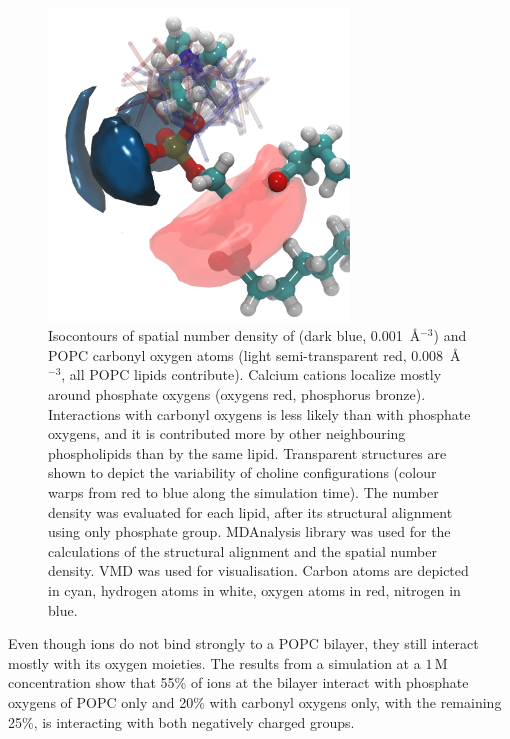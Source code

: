 \documentclass[journal=jpcbfk,manuscript=article]{achemso}
\begin{document}
\begin{figure}[tb!]
  \centering
  \includegraphics[width=8.0cm]{../Fig/isocontours_r37_ca_O-carb.png} %
  \caption{\label{fig:volmaps}
    Isocontours of spatial number density of  (dark blue, 0.001~\AA$^{-3}$) 
    and POPC carbonyl oxygen atoms (light semi-transparent red, 0.008~\AA$^{-3}$, all POPC lipids contribute). 
    Calcium cations localize mostly around phosphate oxygens (oxygens red, phosphorus bronze).
    Interactions with carbonyl oxygens is less likely than with phosphate oxygens, 
    and it is contributed more by other neighbouring phospholipids than by the same lipid. 
    Transparent structures are shown to depict the variability of choline configurations 
    (colour warps from red to blue along the simulation time). 
    The number density was evaluated for each lipid, 
    after its structural alignment using only phosphate group.
    MDAnalysis \cite{mdanalysis2011} library was used for 
    the calculations of the structural alignment and the spatial number density. 
    VMD \cite{hump96} was used for visualisation. 
    Carbon atoms are depicted in cyan, hydrogen atoms in white, oxygen atoms in red, nitrogen in blue.
  }
\end{figure}

Even though  ions do not bind strongly to a POPC bilayer, they still interact mostly with its oxygen moieties. The results from a simulation at a $1\,$M  concentration show that 55\% of  ions at the bilayer interact with phosphate oxygens of POPC only and 20\% with carbonyl oxygens only, with the remaining 25\%, is interacting with both negatively charged groups.
\end{document}
